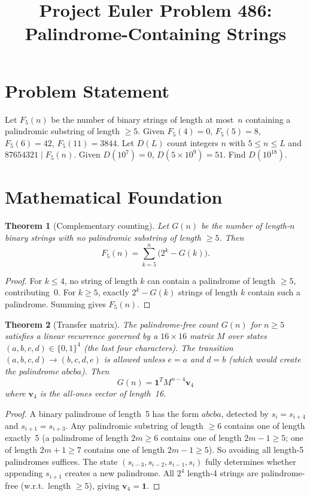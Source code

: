 \documentclass[12pt]{article}
\title{Project Euler Problem 486: Palindrome-Containing Strings}
\author{}
\date{}
\newtheorem{theorem}{Theorem}
\begin{document}
\maketitle

\section{Problem Statement}
Let $F_5(n)$ be the number of binary strings of length at most~$n$ containing a palindromic substring of length $\ge 5$. Given $F_5(4)=0$, $F_5(5)=8$, $F_5(6)=42$, $F_5(11)=3844$. Let $D(L)$ count integers $n$ with $5\le n\le L$ and $87654321\mid F_5(n)$. Given $D(10^7)=0$, $D(5\times 10^9)=51$. Find $D(10^{18})$.

\section{Mathematical Foundation}

\begin{theorem}[Complementary counting]
Let $G(n)$ be the number of length-$n$ binary strings with no palindromic substring of length $\ge 5$. Then
\[
F_5(n) = \sum_{k=5}^n\bigl(2^k - G(k)\bigr).
\]
\end{theorem}

\begin{proof}
For $k\le 4$, no string of length $k$ can contain a palindrome of length $\ge 5$, contributing~0. For $k\ge 5$, exactly $2^k - G(k)$ strings of length $k$ contain such a palindrome. Summing gives $F_5(n)$.
\end{proof}

\begin{theorem}[Transfer matrix]
The palindrome-free count $G(n)$ for $n\ge 5$ satisfies a linear recurrence governed by a $16\times 16$ matrix $M$ over states $(a,b,c,d)\in\{0,1\}^4$ (the last four characters). The transition $(a,b,c,d)\to(b,c,d,e)$ is allowed unless $e=a$ and $d=b$ (which would create the palindrome $abcba$). Then
\[
G(n) = \mathbf{1}^T M^{n-4}\mathbf{v}_4
\]
where $\mathbf{v}_4$ is the all-ones vector of length~16.
\end{theorem}

\begin{proof}
A binary palindrome of length~5 has the form $abcba$, detected by $s_i=s_{i+4}$ and $s_{i+1}=s_{i+3}$. Any palindromic substring of length $\ge 6$ contains one of length exactly~5 (a palindrome of length $2m\ge 6$ contains one of length $2m-1\ge 5$; one of length $2m+1\ge 7$ contains one of length $2m-1\ge 5$). So avoiding all length-5 palindromes suffices. The state $(s_{i-3},s_{i-2},s_{i-1},s_i)$ fully determines whether appending $s_{i+1}$ creates a new palindrome. All $2^4$ length-4 strings are palindrome-free (w.r.t.\ length $\ge 5$), giving $\mathbf{v}_4 = \mathbf{1}$.
\end{proof}
\end{document}
